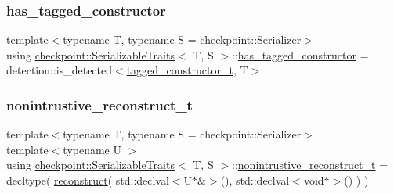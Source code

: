 \mbox{\label{structcheckpoint_1_1_serializable_traits_a3388d17f4748bf899e063b3d05e0dbe4}} 
\subsubsection{\texorpdfstring{has\+\_\+tagged\+\_\+constructor}{has\_tagged\_constructor}}
{\footnotesize\ttfamily template$<$typename T, typename S = checkpoint\+::\+Serializer$>$ \\
using \hyperlink{structcheckpoint_1_1_serializable_traits}{checkpoint\+::\+Serializable\+Traits}$<$ T, S $>$\+::\hyperlink{structcheckpoint_1_1_serializable_traits_a3388d17f4748bf899e063b3d05e0dbe4}{has\+\_\+tagged\+\_\+constructor} =  detection\+::is\+\_\+detected$<$\hyperlink{structcheckpoint_1_1_serializable_traits_a5a1f289a5008468335f22e288a96d861}{tagged\+\_\+constructor\+\_\+t}, T$>$}

\mbox{\label{structcheckpoint_1_1_serializable_traits_abe5231bdf561e55fd9e0673e42a8a96c}} 
\subsubsection{\texorpdfstring{nonintrustive\+\_\+reconstruct\+\_\+t}{nonintrustive\_reconstruct\_t}}
{\footnotesize\ttfamily template$<$typename T, typename S = checkpoint\+::\+Serializer$>$ \\
template$<$typename U $>$ \\
using \hyperlink{structcheckpoint_1_1_serializable_traits}{checkpoint\+::\+Serializable\+Traits}$<$ T, S $>$\+::\hyperlink{structcheckpoint_1_1_serializable_traits_abe5231bdf561e55fd9e0673e42a8a96c}{nonintrustive\+\_\+reconstruct\+\_\+t} =  decltype( \hyperlink{namespacecheckpoint_a6254f2e220f905a2b0c797c08092a7a1}{reconstruct}( std\+::declval$<$U$\ast$\&$>$(), std\+::declval$<$void$\ast$$>$() ) )}

